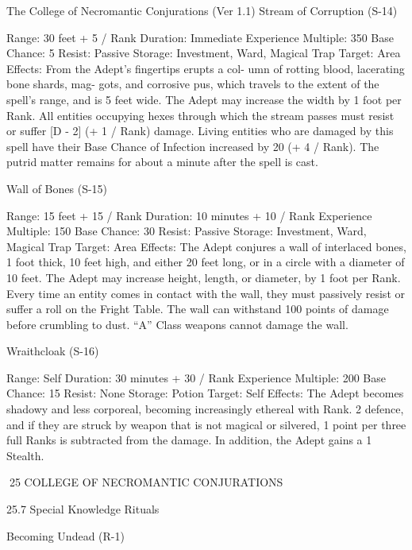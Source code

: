 \begin{Chapter}{The College of Necromantic Conjurations (Ver 1.1)}
Stream of Corruption (S-14) 

Range: 30 feet + 5 / Rank 
Duration: Immediate 
Experience Multiple: 350 
Base Chance: 5%
Resist: Passive 
Storage: Investment, Ward, Magical Trap 
Target: Area 
Effects:  From  the  Adept’s  fingertips  erupts  a  col-
umn of rotting blood, lacerating bone shards, mag-
gots, and corrosive pus, which travels to the extent 
of the spell’s range, and is 5 feet wide. The Adept 
may  increase  the  width  by  1  foot  per  Rank.  All 
entities occupying hexes through which the stream 
passes  must  resist  or  suffer  [D  -  2]  (+  1  /  Rank) 
damage.  Living  entities  who  are  damaged  by  this 
spell have their Base Chance of Infection increased 
by  20  (+  4  / Rank).  The  putrid  matter  remains  for 
about a minute after the spell is cast. 

Wall of Bones (S-15) 

Range: 15 feet + 15 / Rank 
Duration: 10 minutes + 10 / Rank 
Experience Multiple: 150 
Base Chance: 30%
Resist: Passive 
Storage: Investment, Ward, Magical Trap 
Target: Area 
Effects:  The  Adept  conjures  a  wall  of  interlaced 
bones, 1 foot thick, 10 feet high, and either 20 feet 
long, or in a circle with a diameter of 10 feet. The 
Adept may increase height, length, or diameter, by 
1  foot  per  Rank.  Every  time  an  entity  comes  in 
contact with the wall, they must passively resist or 
suffer  a  roll  on  the  Fright  Table.  The  wall  can 
withstand  100  points  of  damage  before  crumbling 
to  dust.  “A”  Class  weapons  cannot  damage  the 
wall. 

Wraithcloak (S-16) 

Range: Self 
Duration: 30 minutes + 30 / Rank 
Experience Multiple: 200 
Base Chance: 15%
Resist: None 
Storage: Potion 
Target: Self 
Effects:  The  Adept  becomes  shadowy  and  less 
corporeal,  becoming  increasingly  ethereal  with 
Rank. 2%
defence,  and  if  they  are  struck  by  weapon  that  is 
not magical or silvered, 1 point per three full Ranks 
is  subtracted  from  the  damage.  In  addition,  the 
Adept  gains  a  1%
Stealth. 

25 COLLEGE OF NECROMANTIC CONJURATIONS 

25.7 Special Knowledge Rituals 

Becoming Undead (R-1) 


\end{Chapter}
